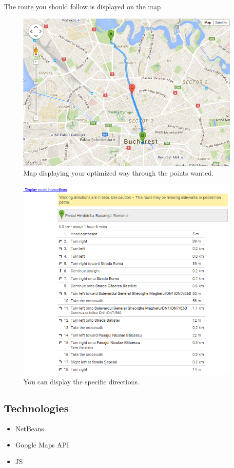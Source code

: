 		The route you should follow is displayed on the map
		
		\begin{figure}[h!]
			\centering
			\includegraphics[scale=0.7]{input/map_result.png}
			\caption{\label{fig:general}Map displaying your optimized way through the points wanted.}
		\end{figure}
		
		\begin{figure}[h!]
			\centering
			\includegraphics[scale=0.9]{input/instructions.png}
			\caption{\label{fig:general}You can display the specific directions.}
		\end{figure}
		
		\newpage\subsection{Technologies}
			\begin{itemize}
				\item NetBeans
				\item Google Maps API
				\item JS
			\end{itemize}
